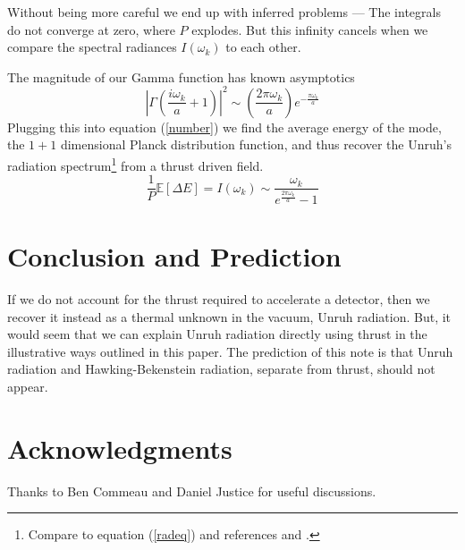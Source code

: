 \documentclass[12pt,a4paper]{article}
\begin{document}
Without being more careful we end up with inferred problems --- The integrals do not converge at zero, where $P$ explodes.  But this infinity cancels when we compare the spectral radiances $I(\omega_k)$ to each other.

The magnitude of our Gamma function has known asymptotics \cite[Eq.~5.11.9]{NIST:DLMF}
\begin{equation}
\left|\Gamma\left(\frac{i\omega_k}{a} + 1\right) \right|^2 \sim \left(\frac{2 \pi \omega_k} {a}\right) e^{-\frac{\pi\omega_k}{a}}
\end{equation}
Plugging this into equation (\ref{number}) we find the average energy of the mode, the $1+1$ dimensional Planck distribution function, and thus recover the Unruh's radiation spectrum\footnote{Compare to equation (\ref{radeq}) and references \cite{unruh} and \cite{Frodden}.} from a thrust driven field.
\begin{equation}
\frac{1}{P} \mathbb{E}[\Delta E] = I(\omega_k) \sim \frac{\omega_k}{e^{\frac{2 \pi \omega_k}{a}}-1}
\end{equation}

\section{Conclusion and Prediction}
If we do not account for the thrust required to accelerate a detector, then we recover it instead as a thermal unknown in the vacuum, Unruh radiation.  But, it would seem that we can explain Unruh radiation directly using thrust in the illustrative ways outlined in this paper.  The prediction of this note is that Unruh radiation and Hawking-Bekenstein radiation, separate from thrust, should not appear.

\section{Acknowledgments}
Thanks to Ben Commeau and Daniel Justice for useful discussions.



\end{document}
